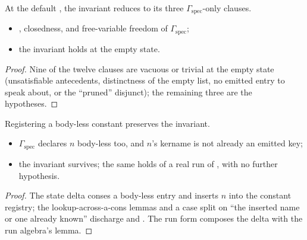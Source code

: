 \begin{lemma}
\label{lem:RegInvShape-prime-empty}
\leanok
{}
 At the default , the invariant reduces to its three
$\Gamma_{\mathrm{spec}}$-only clauses.
\begin{itemize}
\item {} , closedness, and free-variable freedom of $\Gamma_{\mathrm{spec}}$;
\item {} the invariant holds at the empty state.
\end{itemize}
\end{lemma}
\begin{proof}
\leanok
{}
 Nine of the twelve clauses are vacuous or trivial at the empty state (unsatisfiable
antecedents, distinctness of the empty list, no emitted entry to speak about, or the ``pruned''
disjunct); the remaining three are the hypotheses.
\end{proof}
\begin{lemma}
\label{lem:RegInvShape-prime-addAxiom}
\leanok
{}
 Registering a body-less constant preserves the invariant.
\begin{itemize}
\item {} $\Gamma_{\mathrm{spec}}$ declares $n$ body-less too, and $n$'s kername is not already
an emitted key;
\item {} the invariant survives; the same holds of a real run of , with
no further hypothesis.
\end{itemize}
\end{lemma}
\begin{proof}
\leanok
{}
 The state delta conses a body-less entry and inserts $n$ into the constant registry; the
lookup-across-a-cons lemmas and a case split on ``the inserted name or one already known'' discharge
 and . The run form composes the delta with the run algebra's
 lemma.
\end{proof}

